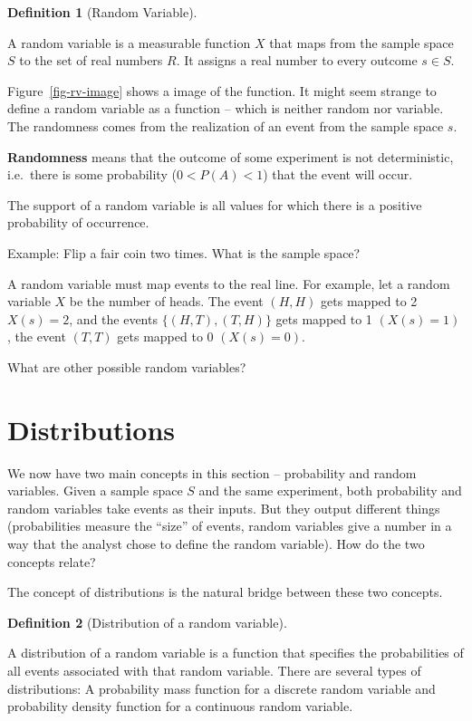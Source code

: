 \documentclass[
  letterpaper,
]{book}
\theoremstyle{definition}
\newtheorem{definition}{Definition}[chapter]
\theoremstyle{definition}
\theoremstyle{plain}
\theoremstyle{definition}
\theoremstyle{plain}
\theoremstyle{plain}
\theoremstyle{remark}
\begin{document}
\leavevmode{}%
\begin{definition}[Random Variable]\label{def-}

A random variable is a measurable function \(X\) that maps from the
sample space \(S\) to the set of real numbers \(R.\) It assigns a real
number to every outcome \(s \in S\).

\end{definition}

Figure~\ref{fig-rv-image} shows a image of the function. It might seem
strange to define a random variable as a function -- which is neither
random nor variable. The randomness comes from the realization of an
event from the sample space \(s\).

\textbf{Randomness} means that the outcome of some experiment is not
deterministic, i.e.~there is some probability (\(0 < P(A) < 1\)) that
the event will occur.

The support of a random variable is all values for which there is a
positive probability of occurrence.

Example: Flip a fair coin two times. What is the sample space?

A random variable must map events to the real line. For example, let a
random variable \(X\) be the number of heads. The event \((H, H)\) gets
mapped to 2 \(X(s) = 2\), and the events \(\{(H, T), (T, H)\}\) gets
mapped to 1 \((X(s) = 1)\), the event \((T, T)\) gets mapped to 0
\((X(s) = 0)\).

What are other possible random variables?

\hypertarget{distributions}{%
\section{Distributions}\label{distributions}}

We now have two main concepts in this section -- probability and random
variables. Given a sample space \(S\) and the same experiment, both
probability and random variables take events as their inputs. But they
output different things (probabilities measure the ``size'' of events,
random variables give a number in a way that the analyst chose to define
the random variable). How do the two concepts relate?

The concept of distributions is the natural bridge between these two
concepts.

\leavevmode{}%
\begin{definition}[Distribution of a random variable]\label{def-}

A distribution of a random variable is a function that specifies the
probabilities of all events associated with that random variable. There
are several types of distributions: A probability mass function for a
discrete random variable and probability density function for a
continuous random variable.

\end{definition}
\end{document}

